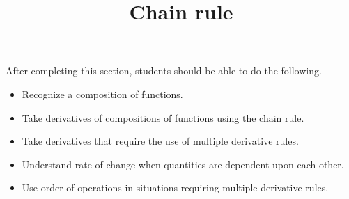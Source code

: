 \documentclass{ximera}
\title{Chain rule}
\begin{document}
\begin{abstract}
\end{abstract}

\maketitle

\begin{sectionOutcomes}

After completing this section, students should be able to do the following.

\begin{itemize}
	\item Recognize a composition of functions.
	\item Take derivatives of compositions of functions using the chain rule.
	\item Take derivatives that require the use of multiple derivative rules.
	\item Understand rate of change when quantities are dependent upon each other.
	\item Use order of operations in situations requiring multiple derivative rules.
\end{itemize}

\end{sectionOutcomes}
\end{document}
